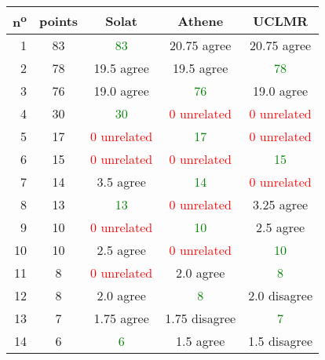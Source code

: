 \begin{center}
 \begin{tabular}{ r | c || c c c }
  n\textsuperscript{o} & points & Solat                        & Athene                       & UCLMR                        \\ \hline
  1                    & 83     & \textcolor{green}{83}        & 20.75 agree                  & 20.75 agree                  \\
  2                    & 78     & 19.5 agree                   & 19.5 agree                   & \textcolor{green}{78}        \\
  3                    & 76     & 19.0 agree                   & \textcolor{green}{76}        & 19.0 agree                   \\
  4                    & 30     & \textcolor{green}{30}        & \textcolor{red}{0 unrelated} & \textcolor{red}{0 unrelated} \\
  5                    & 17     & \textcolor{red}{0 unrelated} & \textcolor{green}{17}        & \textcolor{red}{0 unrelated} \\
  6                    & 15     & \textcolor{red}{0 unrelated} & \textcolor{red}{0 unrelated} & \textcolor{green}{15}        \\
  7                    & 14     & 3.5 agree                    & \textcolor{green}{14}        & \textcolor{red}{0 unrelated} \\
  8                    & 13     & \textcolor{green}{13}        & \textcolor{red}{0 unrelated} & 3.25 agree                   \\
  9                    & 10     & \textcolor{red}{0 unrelated} & \textcolor{green}{10}        & 2.5 agree                    \\
  10                   & 10     & 2.5 agree                    & \textcolor{red}{0 unrelated} & \textcolor{green}{10}        \\
  11                   & 8      & \textcolor{red}{0 unrelated} & 2.0 agree                    & \textcolor{green}{8}         \\
  12                   & 8      & 2.0 agree                    & \textcolor{green}{8}         & 2.0 disagree                 \\
  13                   & 7      & 1.75 agree                   & 1.75 disagree                & \textcolor{green}{7}         \\
  14                   & 6      & \textcolor{green}{6}         & 1.5 agree                    & 1.5 disagree                 \\

\end{tabular}
\end{center}
